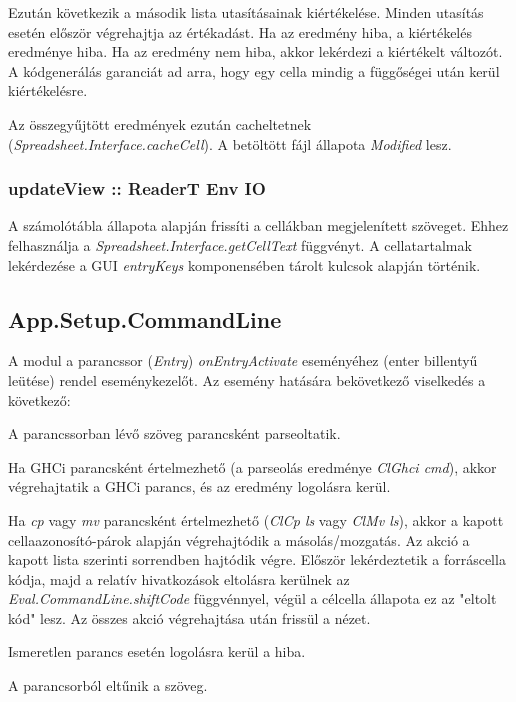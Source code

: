 Ezután következik a második lista utasításainak kiértékelése. Minden utasítás esetén először végrehajtja az értékadást. Ha az eredmény hiba, a kiértékelés eredménye hiba. Ha az eredmény nem hiba, akkor lekérdezi a kiértékelt változót. A kódgenerálás garanciát ad arra, hogy egy cella mindig a függőségei után kerül kiértékelésre.

Az összegyűjtött eredmények ezután cacheltetnek \mbox{(\textit{Spreadsheet.Interface.cacheCell})}. A betöltött fájl állapota \textit{Modified} lesz.

\subsubsection{updateView :: ReaderT Env IO}

A számolótábla állapota alapján frissíti a cellákban megjelenített szöveget. Ehhez felhasználja a \textit{Spreadsheet.Interface.getCellText} függvényt. A cellatartalmak lekérdezése a GUI \textit{entryKeys} komponensében tárolt kulcsok alapján történik.

\subsection{App.Setup.CommandLine}

A modul a parancssor (\textit{Entry}) \textit{onEntryActivate} eseményéhez (enter billentyű leütése) rendel eseménykezelőt. Az esemény hatására bekövetkező viselkedés a következő:
\begin{compactenum}
	\item A parancssorban lévő szöveg parancsként parseoltatik.
	\item Ha GHCi parancsként értelmezhető (a parseolás eredménye \textit{ClGhci cmd}), akkor végrehajtatik a GHCi parancs, és az eredmény logolásra kerül.
	\item Ha \textit{cp} vagy \textit{mv} parancsként értelmezhető (\textit{ClCp ls} vagy \textit{ClMv ls}), akkor a kapott cellaazonosító-párok alapján végrehajtódik a másolás/mozgatás. Az akció a kapott lista szerinti sorrendben hajtódik végre. Először lekérdeztetik a forráscella kódja, majd a relatív hivatkozások eltolásra kerülnek az \textit{Eval.CommandLine.shiftCode} függvénnyel, végül a célcella állapota ez az "eltolt kód" lesz. Az összes akció végrehajtása után frissül a nézet.
	\item Ismeretlen parancs esetén logolásra kerül a hiba.
	\item A parancsorból eltűnik a szöveg.
\end{compactenum}

